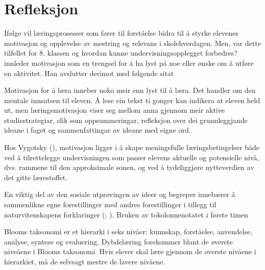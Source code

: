 \documentclass[main.tex]{subfiles}
\begin{document}
\section*{Refleksjon}
\label{sec:3}

Ifølge  vil læringsprosesser som fører til forståelse bidra til å styrke elevenes motivasjon og 
opplevelse av mestring og relevans i skolehverdagen. Men, var dette tilfellet for 8. klassen og hvordan
kunne undervisningsopplegget forbedres?
\newline
\newline
{} innleder motivasjon som en trengsel for å ha lyst på noe eller ønske om å utføre en aktivitet.
Han avslutter derimot med følgende sitat
\begin{displayquote}
Motivasjon for å læra inneber noko meir enn lyst til å læra. Det handler om den mentale innsatsen til eleven.
Å lese ein tekst ti gonger kan indikera at eleven held ut, men læringsmotivasjon viser seg mellom anna gjennom
meir aktive studiestrategiar, slik som oppsummeringar, refleksjon over dei grunnleggjande ideane i faget og 
sammenfattingar av ideane med eigne ord.
\end{displayquote}
Hos Vygotsky (), motivasjon ligger i å skape meningsfulle læringsbetingelser både ved å tilrettelegge 
undervisningen som passer elevens aktuelle og potensielle nivå, dvs. rammene til den approksimale sonen, og ved å tydeliggjøre 
nytteverdien av det gitte lærestoffet. 

En viktig del av den sosiale utprøvingen av ideer og begreper innebærer å sammenlikne egne forestillinger
med andres forestillinger i tillegg til naturvitenskapens forklaringer (; ).
Bruken av tokolonnenotatet i første timen 

Blooms taksonomi er et hierarki i seks nivåer: kunnskap, forståelse, anvendelse, analyse, syntese og evaluering. Dybdelæring forekommer blant de øverste niveåene
i Blooms taksonomi. Hvis elever skal lære gjennom de øverste nivåene i hierarkiet, må de selvsagt mestre de lavere nivåene.
\end{document}
